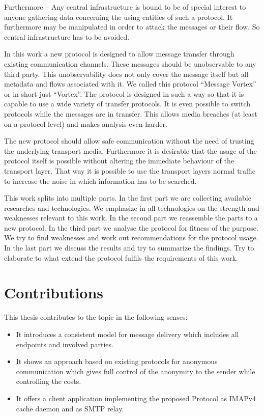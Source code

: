 Furthermore -- Any central infrastructure is bound to be of special interest to anyone gathering data concerning the using entities of such a protocol. It furthermore may be manipulated in order to attack the messages or their flow. So central infrastructure has to be avoided.

In this work a new protocol is designed to allow message transfer through existing communication channels. These messages should be unobservable to any third party. This unobservability does not only cover the message itself but all metadata and flows associated with it. We called this protocol ``Message Vortex'' or in short just ``Vortex''. The protocol is designed in such a way so that it is capable to use a wide variety of transfer protocols. It is even possible to switch protocols while the messages are in transfer. This allows media breaches (at least on a protocol level) and makes analysis even harder.

The new protocol should allow safe communication without the need of trusting the underlying transport media. Furthermore it is desirable that the usage of the protocol itself is possible without altering the immediate behaviour of the transport layer. That way it is possible to use the transport layers normal traffic to increase the noise in which information has to be searched. 

This work splits into multiple parts. In the first part we are collecting available researches and technologies. We emphasize in all technologies on the strength and weaknesses relevant to this work. In the second part we reassemble the parts to a new protocol. In the third part we analyse the protocol for fitness of the purpose. We try to find weaknesses and work out recommendations for the protocol usage. In the last part we discuss the results and try to summarize the findings. Try to elaborate to what extend the protocol fulfils the requirements of this work.


\section{Contributions}
This thesis contributes to the topic in the following senses:
\begin{itemize}
	\item It introduces a consistent model for message delivery which includes all endpoints and involved parties.
	\item It shows an approach based on existing protocols for anonymous communication which gives full control of the anonymity to the sender while controlling the costs.
	\item It offers a client application implementing the proposed Protocol as IMAPv4 cache daemon and as SMTP relay.
\end{itemize}

